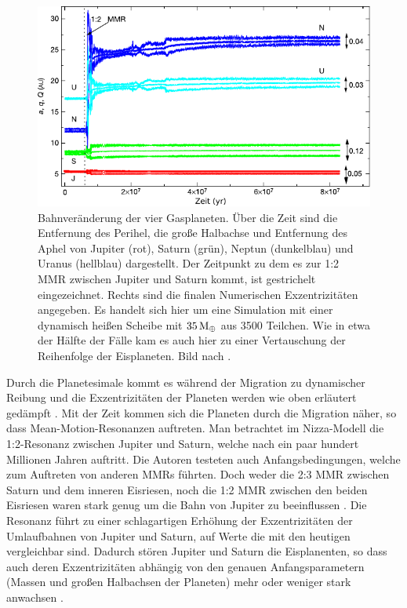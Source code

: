 \documentclass[12pt,a4paper,twoside,open=right,bibliography=totoc]{scrbook}
\renewcommand{\cite}{ \citep}
\newcommand{\ME}{M_\oplus}
\begin{document}
\begin{figure}[tbn]
\centering
\includegraphics[scale=1]{img/Tsiganis2005-1.pdf}
\caption{Bahnveränderung der vier Gasplaneten. Über die Zeit sind die Entfernung des Perihel, die große Halbachse und Entfernung des Aphel von Jupiter (rot), Saturn (grün), Neptun (dunkelblau) und Uranus (hellblau) dargestellt. Der Zeitpunkt zu dem es zur 1:2 MMR zwischen Jupiter und Saturn kommt, ist gestrichelt eingezeichnet. Rechts sind die finalen Numerischen Exzentrizitäten angegeben. Es handelt sich hier um eine Simulation mit einer dynamisch heißen Scheibe mit $\unit[35]{\ME}$ aus 3500 Teilchen. Wie in etwa der Hälfte der Fälle kam es auch hier zu einer Vertauschung der Reihenfolge der Eisplaneten. Bild nach \cite{Tsiganis2005}.}
\label{fig:Orbitalevolution}
\end{figure}
Durch die Planetesimale kommt es während der Migration zu dynamischer Reibung und die Exzentrizitäten der Planeten werden wie oben erläutert gedämpft\cite{Tsiganis2005}.
Mit der Zeit kommen sich die Planeten durch die Migration näher, so dass Mean-Motion-Resonanzen auftreten.
Man betrachtet im Nizza-Modell die 1:2-Resonanz zwischen Jupiter und Saturn, welche nach ein paar hundert Millionen Jahren auftritt.
Die Autoren testeten auch Anfangsbedingungen, welche zum Auftreten von anderen MMRs führten. Doch weder die 2:3 MMR zwischen Saturn und dem inneren Eisriesen, noch die 1:2 MMR zwischen den beiden Eisriesen waren stark genug um die Bahn von Jupiter zu beeinflussen\cite{Tsiganis2005}.
Die Resonanz führt zu einer schlagartigen Erhöhung der Exzentrizitäten der Umlaufbahnen von Jupiter und Saturn, auf Werte die mit den heutigen vergleichbar sind.
Dadurch stören Jupiter und Saturn die Eisplanenten, so dass auch deren Exzentrizitäten abhängig von den genauen Anfangsparametern (Massen und großen Halbachsen der Planeten) mehr oder weniger stark anwachsen\cite{Tsiganis2005}.
\end{document}

